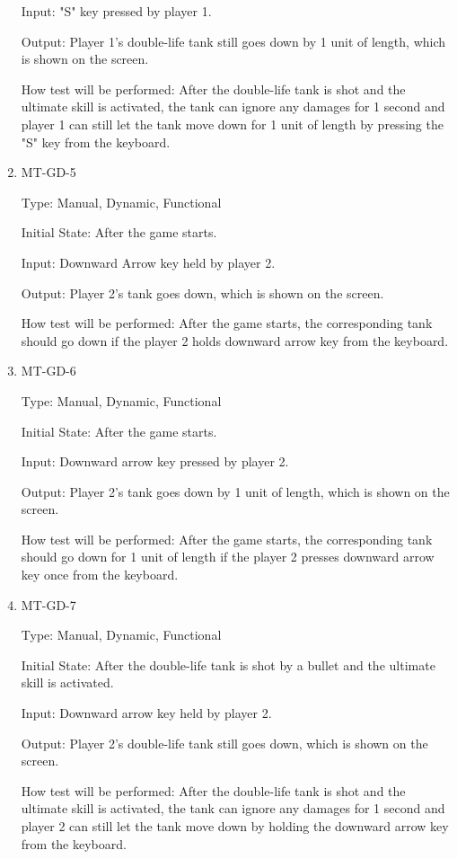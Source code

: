 \documentclass[12pt, titlepage]{article}
\begin{document}
\begin{enumerate}
Input: "S" key pressed by player 1.
					
Output: Player 1's double-life tank still goes down by 1 unit of length, which is shown on the screen.
					
How test will be performed: After the double-life tank is shot and the ultimate skill is activated, the tank can ignore any damages for 1 second and player 1 can still let the tank move down for 1 unit of length by pressing the "S" key from the keyboard.

\item{MT-GD-5\\}

Type: Manual, Dynamic, Functional
					
Initial State: After the game starts.
					
Input: Downward Arrow key held by player 2.
					
Output: Player 2's tank goes down, which is shown on the screen.
					
How test will be performed: After the game starts, the corresponding tank should go down if the player 2 holds downward arrow key from the keyboard. 
					
\item{MT-GD-6\\}

Type: Manual, Dynamic, Functional
					
Initial State: After the game starts.
					
Input: Downward arrow key pressed by player 2.
					
Output: Player 2's tank goes down by 1 unit of length, which is shown on the screen.
					
How test will be performed: After the game starts, the corresponding tank should go down for 1 unit of length if the player 2 presses downward arrow key once from the keyboard. 

\item{MT-GD-7\\}

Type: Manual, Dynamic, Functional
					
Initial State: After the double-life tank is shot by a bullet and the ultimate skill is activated.
					
Input: Downward arrow key held by player 2.
					
Output: Player 2's double-life tank still goes down, which is shown on the screen.
					
How test will be performed: After the double-life tank is shot and the ultimate skill is activated, the tank can ignore any damages for 1 second and player 2 can still let the tank move down by holding the downward arrow key from the keyboard.


\end{enumerate}
\end{document}
